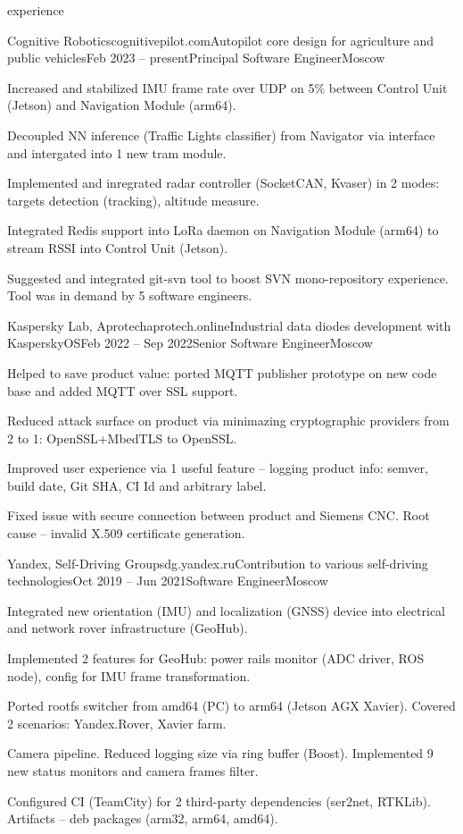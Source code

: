 \documentclass{Vladimir.Ivanov.CV}
\begin{document}
\begin{rSection}{experience}
\begin{rCompany}{Cognitive Robotics}{cognitivepilot.com}{Autopilot core design for agriculture and public vehicles}{Feb 2023 -- present}{Principal Software Engineer}{Moscow}

\item Increased and stabilized IMU frame rate over UDP on 5\% between Control Unit (Jetson) and Navigation Module (arm64).
\item Decoupled NN inference (Traffic Lights classifier) from Navigator via interface and intergated into 1 new tram module.
\item Implemented and inregrated radar controller (SocketCAN, Kvaser) in 2 modes: targets detection (tracking), altitude measure.
\item Integrated Redis support into LoRa daemon on Navigation Module (arm64) to stream RSSI into Control Unit (Jetson).
\item Suggested and integrated git-svn tool to boost SVN mono-repository experience. Tool was in demand by 5 software engineers.

\end{rCompany}
\begin{rCompany}{Kaspersky Lab, Aprotech}{aprotech.online}{Industrial data diodes development with KasperskyOS}{Feb 2022 -- Sep 2022}{Senior Software Engineer}{Moscow}

\item Helped to save product value: ported MQTT publisher prototype on new code base and added MQTT over SSL support.
\item Reduced attack surface on product via minimazing cryptographic providers from 2 to 1: OpenSSL+MbedTLS to OpenSSL.
\item Improved user experience via 1 useful feature -- logging product info: semver, build date, Git SHA, CI Id and arbitrary label.
\item Fixed issue with secure connection between product and Siemens CNC. Root cause -- invalid X.509 certificate generation.

\end{rCompany}
\begin{rCompany}{Yandex, Self-Driving Group}{sdg.yandex.ru}{Contribution to various self-driving technologies}{Oct 2019 -- Jun 2021}{Software Engineer}{Moscow}

\item Integrated new orientation (IMU) and localization (GNSS) device into electrical and network rover infrastructure (GeoHub).
\item Implemented 2 features for GeoHub: power rails monitor (ADC driver, ROS node), config for IMU frame transformation.
\item Ported rootfs switcher from amd64 (PC) to arm64 (Jetson AGX Xavier). Covered 2 scenarios: Yandex.Rover, Xavier farm.
\item Camera pipeline. Reduced logging size via ring buffer (Boost). Implemented 9 new status monitors and camera frames filter.
\item Configured CI (TeamCity) for 2 third-party dependencies (ser2net, RTKLib). Artifacts -- deb packages (arm32, arm64, amd64).


\end{rCompany}
\end{rSection}
\end{document}
